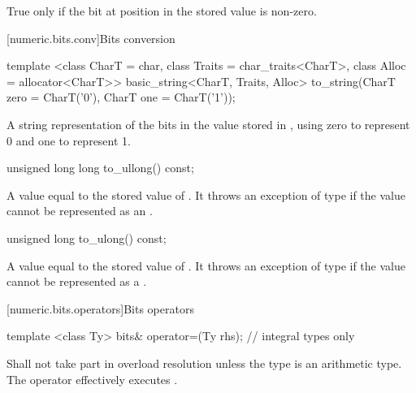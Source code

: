 \begin{addedblock}
\begin{itemdescr}
\returns True only if the bit at position  in the stored value is non-zero.
\end{itemdescr}

[numeric.bits.conv]{Bits conversion}

\begin{itemdecl}
template <class CharT = char, class Traits = char_traits<CharT>, class Alloc = allocator<CharT>>
  basic_string<CharT, Traits, Alloc> to_string(CharT zero = CharT('0'),
                                               CharT one = CharT('1'));	
\end{itemdecl}

\begin{itemdescr}
\returns A string representation of the bits in the value stored in , using zero to represent 0 and one to represent 1.	
\end{itemdescr}

\begin{itemdecl}
unsigned long long to_ullong() const;	
\end{itemdecl}

\begin{itemdescr}
\returns A value equal to the stored value of . It throws an exception of type  if the value cannot be represented as an .	
\end{itemdescr}

\begin{itemdecl}
unsigned long to_ulong() const;	
\end{itemdecl}

\begin{itemdescr}
\returns A value equal to the stored value of . It throws an exception of type  if the value cannot be represented as a .	
\end{itemdescr}

[numeric.bits.operators]{Bits operators}

\begin{itemdecl}
template <class Ty>
  bits& operator=(Ty rhs);   // integral types only		
\end{itemdecl}

\begin{itemdescr}
\effects Shall not take part in overload resolution unless the type  is an arithmetic type. The operator effectively executes .


\end{itemdescr}
\end{addedblock}
